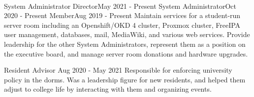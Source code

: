\vspace{1.5pt} %


\cvtag{\LaTeX}
\medskip
\\



    {System Administrator Director}{May 2021 - Present}
    {System Administrator}{Oct 2020 - Present}
    {Member}{Aug 2019 - Present}
    {Maintain services for a student-run server room including an Openshift/OKD 4 cluster, Proxmox cluster, FreeIPA user management, databases, mail, MediaWiki, and various web services. Provide leadership for the other System Administrators, represent them as a position on the executive board, and manage server room donations and hardware upgrades.}

    {Resident Advisor} {Aug 2020 - May 2021}
    {Responsible for enforcing university policy in the dorms. Was a leadership figure for new residents, and helped them adjust to college life by interacting with them and organizing events.}
